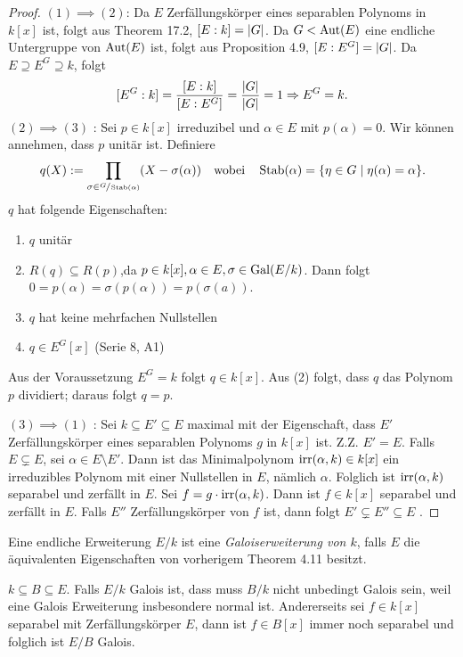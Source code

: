 \begin{proof}
	$(1) \implies (2)$: Da $E$ Zerfällungskörper eines separablen Polynoms in $k[x]$ ist, folgt aus Theorem 17.2, $[E:k] = \abs{G}$.
	Da $G < \operatorname{Aut}(E)$ eine endliche Untergruppe von $\operatorname{Aut}(E)$ ist, folgt aus Proposition 4.9, $[E:E^{G}] = \abs{G}$.
	Da $E \supseteq E^{G} \supseteq k$, folgt
	\[
		[E^{G} : k] = \frac{[E : k]}{[E : E^{G}]} = \frac{\abs{G}}{\abs{G}} = 1 \Rightarrow E^{G} = k
	.\] 
	$(2) \implies (3)$ : Sei $p \in k[x]$ irreduzibel und $\alpha \in E$ mit $p(\alpha) = 0$. Wir können annehmen, dass $p$ unitär ist. Definiere
	\[
		q(X) := \prod_{\sigma \in \sfrac{G}{\operatorname{Stab}(\alpha)}} (X - \sigma(\alpha)) \qq{wobei} \operatorname{Stab}(\alpha) = \{\eta \in G \mid \eta(\alpha) = \alpha\}  
	.\]
	$q$ hat folgende Eigenschaften:
	\begin{enumerate}[(1)]
		\item $q$ unitär
		\item $R(q) \subseteq R(p)$,da $p \in k[x], \alpha \in E, \sigma \in \operatorname{Gal}(E / k)$. Dann folgt $0 = p(\alpha) = \sigma(p(\alpha)) = p(\sigma(a))$.
		\item $q$ hat keine mehrfachen Nullstellen
		\item $q \in E^{G}[x]$ (Serie 8, A1)
	\end{enumerate}
	Aus der Voraussetzung $E^{G} = k$ folgt $q \in k[x]$. Aus (2) folgt, dass $q$ das Polynom $p$ dividiert; daraus folgt $q = p$.

	$(3) \implies (1)$ : Sei $k \subseteq E' \subseteq E$ maximal mit der Eigenschaft, dass $E'$ Zerfällungskörper eines separablen Polynoms $g$ in $k[x]$ ist.
	Z.Z. $E' = E$. Falls $E \subsetneq E$, sei $\alpha \in E \setminus E'$. Dann ist das Minimalpolynom $\operatorname{irr}(\alpha,k) \in k[x]$ ein irreduzibles Polynom
	mit einer Nullstellen in $E$, nämlich $\alpha$. Folglich ist $\operatorname{irr}(\alpha,k)$ separabel und zerfällt in $E$.
	Sei $f = g \cdot \operatorname{irr}(\alpha,k)$. Dann ist $f \in k[x]$ separabel und zerfällt in $E$. 
	Falls $E''$ Zerfällungskörper von $f$ ist, dann folgt $E' \subsetneq E'' \subseteq E$ \contra.
\end{proof}

\begin{definition}
	Eine endliche Erweiterung $E / k$ ist eine \emph{Galoiserweiterung von $k$}, falls $E$ die äquivalenten Eigenschaften von vorherigem Theorem 4.11 besitzt.
\end{definition}

$k \subseteq B \subseteq E$. Falls $E / k$ Galois ist, dass muss $B / k$ nicht unbedingt Galois sein, weil eine Galois Erweiterung insbesondere normal ist.
Andererseits sei $f \in k[x]$ separabel mit Zerfällungskörper $E$, dann ist $f \in B[x]$ immer noch separabel und folglich ist $E / B$ Galois.

